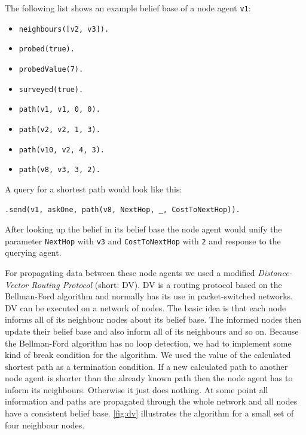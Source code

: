 \begin{samepage}
The following list shows an example belief base of a node agent \texttt{v1}:
\begin{itemize}
  \item \texttt{neighbours([v2, v3]).}
  \item \texttt{probed(true).}
  \item \texttt{probedValue(7).}
  \item \texttt{surveyed(true).}
  \item \texttt{path(v1, v1, 0, 0).}
  \item \texttt{path(v2, v2, 1, 3).}
  \item \texttt{path(v10, v2, 4, 3).}
  \item \texttt{path(v8, v3, 3, 2).}
\end{itemize}
\end{samepage}

A query for a shortest path would look like this:
\begin{lstlisting}[caption={Query for shortest path from \texttt{v1} to \texttt{v8}}, label={lst:dv_shortestPath_query}]
  .send(v1, askOne, path(v8, NextHop, _, CostToNextHop)).
\end{lstlisting}
After looking up the belief in its belief base the node agent would unify the parameter \texttt{NextHop} with \texttt{v3} and \texttt{CostToNextHop} with \texttt{2} and response to the querying agent.

For propagating data between these node agents we used a modified \emph{Distance-Vector Routing Protocol} (short: DV).
DV is a routing protocol based on the Bellman-Ford algorithm and normally has its use in packet-switched networks.
DV can be executed on a network of nodes.
The basic idea is that each node informs all of its neighbour nodes about its belief base.
The informed nodes then update their belief base and also inform all of its neighbours and so on.
Because the Bellman-Ford algorithm has no loop detection, we had to implement some kind of break condition for the algorithm.
We used the value of the calculated shortest path as a termination condition.
If a new calculated path to another node agent is shorter than the already known path then the node agent has to inform its neighbours.
Otherwise it just does nothing.
At some point all information and paths are propagated through the whole network and all nodes have a consistent belief base.
\autoref{fig:dv} illustrates the algorithm for a small set of four neighbour nodes.

